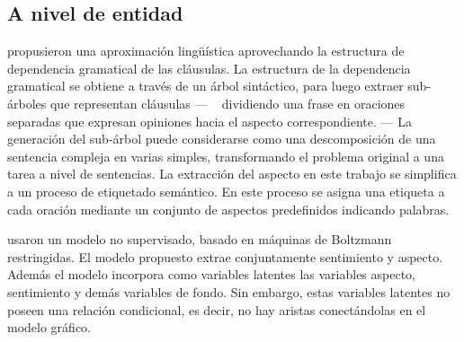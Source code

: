 \subsection{A nivel de entidad}
\label{subsec:soaentity}

\citeauthor{Thet2010} \cite{Thet2010} propusieron una aproximación lingüística
aprovechando la estructura de dependencia gramatical de las cláusulas. La
estructura de la dependencia gramatical se obtiene a través de un árbol
sintáctico, para luego extraer sub-árboles que representan cláusulas --- \eg~
dividiendo una frase en oraciones separadas que expresan opiniones hacia el
aspecto correspondiente. --- La generación del sub-árbol puede considerarse como
una descomposición de una sentencia compleja en varias simples, transformando el
problema original a una tarea a nivel de sentencias. La extracción del aspecto
en este trabajo se simplifica a un proceso de etiquetado semántico. En este
proceso se asigna una etiqueta a cada oración mediante un conjunto de aspectos
predefinidos indicando palabras.

\citeauthor{Wang2015} \cite{Wang2015} usaron un modelo no supervisado, basado en
máquinas de Boltzmann restringidas. El modelo propuesto extrae conjuntamente
sentimiento y aspecto. Además el modelo incorpora como variables latentes las
variables aspecto, sentimiento y demás variables de fondo. Sin embargo, estas
variables latentes no poseen una relación condicional, es decir, no hay aristas
conectándolas en el modelo gráfico.

